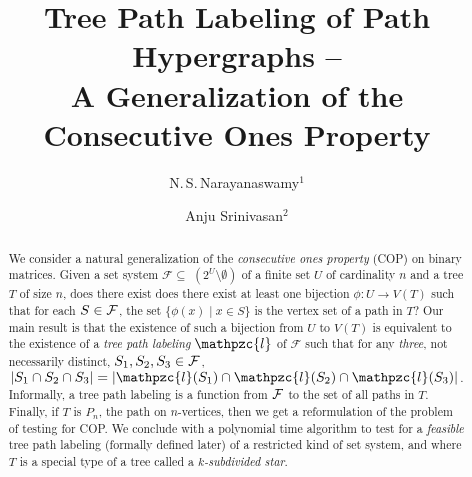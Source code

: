 \documentclass[envcountsect, envcountsame, 11pt]{../lib/llncs2e/llncs}
\def\cF{{\cal F}}
\def\F{{\mathcal F}}
\def\cl{\mathpzc{l}}
\begin{document}
\mainmatter              %
\title{Tree Path Labeling of Path Hypergraphs --\\
  A Generalization of
  the Consecutive Ones Property} 
\author{N.\,S.\,Narayanaswamy$^1$ \and Anju Srinivasan$^{2}$}

\maketitle
\begin{abstract}
  We consider a natural generalization of 
   the {\em consecutive ones property} (COP) on binary matrices.   Given a
  set system $\F \subseteq$ $(2^{U} \setminus \emptyset)$ of a finite
  set $U$ of cardinality $n$ and a tree $T$ of size $n$, does there exist
   does there exist at least one bijection
  $\phi:U \rightarrow V(T)$ such that for each $S \in \cF$, the set $\{\phi(x)
  \mid x \in S\}$ is the vertex set of a path in $T$?    
  Our main result is that the existence of such a bijection from $U$ to $V(T)$ is
  equivalent to  the existence of a {\em tree path
  labeling} $\cl$ of $\F$ such that for any {\em three}, not necessarily distinct, $S_1, S_2, S_3 \in \cF$, $|S_1 \cap S_2 \cap S_3|=|\cl(S_1) \cap \cl(S_2) \cap \cl(S_3)|$.  Informally, a tree path labeling is a function from $\cF$ to the set of all paths in $T$.
 Finally, if $T$ is $P_n$, the path on $n$-vertices, then we get a reformulation of the problem of testing for COP. 
 We conclude with a polynomial time algorithm to
 test for a {\em feasible} tree path labeling (formally defined later) of a restricted kind of set system, and where $T$ is
 a special type of a tree called a  {\em $k$-subdivided star}.
  

\end{abstract}
\end{document}
